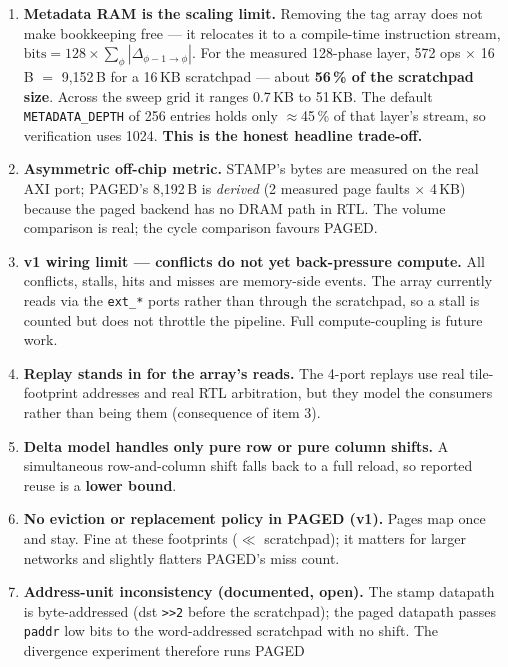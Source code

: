 \documentclass[11pt,a4paper]{article}
\newcommand{\file}[1]{\texttt{\small #1}}
\begin{document}
\begin{enumerate}[leftmargin=1.6em,itemsep=5pt]
  \item \textbf{Metadata RAM is the scaling limit.} Removing the tag array does
        not make bookkeeping free --- it relocates it to a compile-time
        instruction stream, $\text{bits} = 128 \times \sum_\phi
        |\Delta_{\phi-1\to\phi}|$. For the measured 128-phase layer, 572 ops
        $\times$ 16\,B $=$ 9{,}152\,B for a 16\,KB scratchpad --- about
        \textbf{56\,\% of the scratchpad size}. Across the sweep grid it ranges
        0.7\,KB to 51\,KB. The default \file{METADATA\_DEPTH} of 256 entries
        holds only $\approx$45\,\% of that layer's stream, so verification uses
        1024. \textbf{This is the honest headline trade-off.}
  \item \textbf{Asymmetric off-chip metric.} STAMP's bytes are measured on the
        real AXI port; PAGED's 8{,}192\,B is \emph{derived} (2 measured page
        faults $\times$ 4\,KB) because the paged backend has no DRAM path in
        RTL. The volume comparison is real; the cycle comparison favours PAGED.
  \item \textbf{v1 wiring limit --- conflicts do not yet back-pressure compute.}
        All conflicts, stalls, hits and misses are memory-side events. The array
        currently reads via the \file{ext\_*} ports rather than through the
        scratchpad, so a stall is counted but does not throttle the pipeline.
        Full compute-coupling is future work.
  \item \textbf{Replay stands in for the array's reads.} The 4-port replays use
        real tile-footprint addresses and real RTL arbitration, but they model
        the consumers rather than being them (consequence of item 3).
  \item \textbf{Delta model handles only pure row or pure column shifts.} A
        simultaneous row-and-column shift falls back to a full reload, so
        reported reuse is a \textbf{lower bound}.
  \item \textbf{No eviction or replacement policy in PAGED (v1).} Pages map once
        and stay. Fine at these footprints ($\ll$ scratchpad); it matters for
        larger networks and slightly flatters PAGED's miss count.
  \item \textbf{Address-unit inconsistency (documented, open).} The stamp
        datapath is byte-addressed (dst \verb|>>2| before the scratchpad); the
        paged datapath passes \file{paddr} low bits to the word-addressed
        scratchpad with no shift. The divergence experiment therefore runs PAGED

\end{enumerate}
\end{document}
